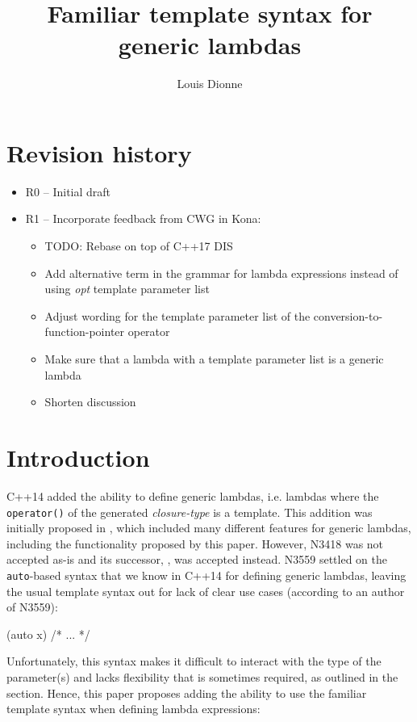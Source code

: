 \documentclass{wg21}
\title{Familiar template syntax for generic lambdas}
\author{Louis Dionne}{ldionne.2@gmail.com}
\newcommand{\cc}[1]{\texttt{#1}}
\begin{document}
\maketitle


\section{Revision history}
\begin{itemize}
  \item R0 -- Initial draft
  \item R1 -- Incorporate feedback from CWG in Kona:
              \begin{itemize}
                \item TODO: Rebase on top of C++17 DIS
                \item Add alternative term in the grammar for lambda expressions
                      instead of using \textit{opt} template parameter list
                \item Adjust wording for the template parameter list of the
                      conversion-to-function-pointer operator
                \item Make sure that a lambda with a template parameter list
                      is a generic lambda
                \item Shorten discussion
              \end{itemize}
\end{itemize}


\section{Introduction}
C++14 added the ability to define generic lambdas, i.e. lambdas where the
\cc{operator()} of the generated \textit{closure-type} is a template. This
addition was initially proposed in \cite{N3418}, which included many different
features for generic lambdas, including the functionality proposed by this
paper. However, N3418 was not accepted as-is and its successor,
\cite{N3559}, was accepted instead. N3559 settled on the \cc{auto}-based
syntax that we know in C++14 for defining generic lambdas, leaving the
usual template syntax out for lack of clear use cases (according to an author
of N3559):

\begin{cpp}
[](auto x) { /* ... */ }
\end{cpp}

Unfortunately, this syntax makes it difficult to interact with the type of the
parameter(s) and lacks flexibility that is sometimes required, as outlined in
the  section. Hence, this paper proposes adding the ability
to use the familiar template syntax when defining lambda expressions:
\end{document}
